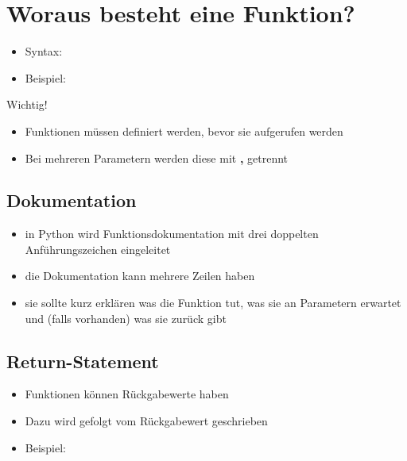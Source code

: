 \section{Woraus besteht eine Funktion?}
\begin{frame}
    \slidehead
    \vspace{-0.2cm}
    \begin{itemize}
        \item Syntax: 
            \pause
            \vspace{-0.05cm}
        \item Beispiel:
    \end{itemize}
    \vspace{-0.05cm}
    \pause
    \begin{block}{Wichtig!}
        \begin{itemize}
            \item Funktionen müssen definiert werden, bevor sie aufgerufen werden
            \item Bei mehreren Parametern werden diese mit \textbf{,} getrennt
        \end{itemize}
    \end{block}
\end{frame}

\subsection{Dokumentation}
\begin{frame}
    \slidehead
    \begin{itemize}
        \item in Python wird Funktionsdokumentation mit drei doppelten Anführungszeichen eingeleitet
        \item die Dokumentation kann mehrere Zeilen haben
        \item sie sollte kurz erklären was die Funktion tut, was sie an Parametern erwartet und (falls vorhanden) was sie zurück gibt
    \end{itemize}
\end{frame}

\subsection{Return-Statement}
\begin{frame}
    \slidehead
    \begin{itemize}
        \item Funktionen können Rückgabewerte haben
        \item Dazu wird  gefolgt vom Rückgabewert geschrieben
        \item Beispiel: 
    \end{itemize}
\end{frame}


